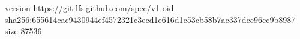 version https://git-lfs.github.com/spec/v1
oid sha256:655614cac9430944ef4572321c3ecd1e616d1c53cb58b7ac337dcc96cc9b8987
size 87536
